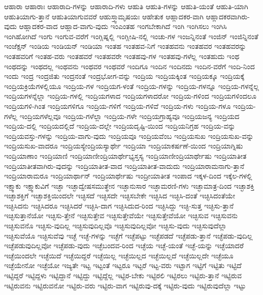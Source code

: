 {ಆಹಾರಾ
ಆಹಾರಾಃ
ಆಹಾರಾದಿ-ಗಳನ್ನು
ಆಹಾರಾದಿ-ಗಳು
ಆಹುತಿ
ಆಹುತಿ-ಗಳನ್ನು
ಆಹುತಿ-ಯಂತೆ
ಆಹುತಿ-ಯಾಗಿ
ಆಹುತಿಯಾಗು-ತ್ತಾನೆ
ಆಹುತಿಯಾಗುವವರೆ
ಆಹುಸ್ತ್ವಾಮೃಷಯಃ
ಆಹೇತುಕ
ಆಹ್ಲಾದಕರ-ವಾಗಿ
ಆಹ್ಲಾದಕರವಾಗಿರು-ವುದು
ಆಹ್ಲಾದಕರ-ವಾದ
ಆಹ್ಲಾದ-ವಾಗು-ವುದು
ಇಂಎಂತಹ
ಇಂಗಬೇಕಾಗಿದೆ
ಇಂಗಿ
ಇಂಗಿಸಲು
ಇಂಗಿಸಿ
ಇಂಗಿಹೋಗಿದೆ
ಇಂಗು
ಇಂಗುವ-ವರೆಗೆ
ಇಂಗ್ಲಿಷ್ನಲ್ಲಿ
ಇಂಗ್ಲೀಷಿ-ನಲ್ಲಿ
ಇಂಚು-ಗಳ
ಇಂಜನ್ನಿನಂತೆ
ಇಂಜಿನ್
ಇಂಜಿನ್ನಿನಂತೆ
ಇಂಜೆಕ್ಷನ್
ಇಂಡಿಯ
ಇಂಡಿಯನ್
ಇಂಡಿಯಾ
ಇಂತಹ
ಇಂತಹವ-ನಿಗೆ
ಇಂತಹವನು
ಇಂತಹವರ
ಇಂತಹವರನ್ನು
ಇಂತಹವರಿಗೆ
ಇಂತಹ-ವರು
ಇಂತಹವರೆ
ಇಂತಹವರೇ
ಇಂತಹವು-ಗಳ
ಇಂತಹವು-ಗಳೆಲ್ಲ
ಇಂತಹುದು
ಇಂಥ
ಇಂಥದನ್ನು
ಇಂಥದಲ್ಲ
ಇಂಥವನು
ಇಂಥವರ
ಇಂಥವರೆ
ಇಂದಿಗೂ
ಇಂದಿನ
ಇಂದಿನದು
ಇಂದಿನ-ವರೆಗೆ
ಇಂದಿ-ನಿಂದ
ಇಂದು
ಇಂದ್ರ
ಇಂದ್ರಜಿತು
ಇಂದ್ರನಂತೆ
ಇಂದ್ರಭೋಗ-ವನ್ನು
ಇಂದ್ರಿಯ
ಇಂದ್ರಿಯಕ್ಕಿಂತ
ಇಂದ್ರಿಯಕ್ಕೂ
ಇಂದ್ರಿಯಕ್ಕೆ
ಇಂದ್ರಿಯಕ್ರಿಯೆಗಳಲ್ಲಿಯೂ
ಇಂದ್ರಿಯ-ಗಳ
ಇಂದ್ರಿಯಗ-ಳಂತೆ
ಇಂದ್ರಿಯ-ಗಳನ್ನು
ಇಂದ್ರಿಯ-ಗಳನ್ನೂ
ಇಂದ್ರಿಯ-ಗಳನ್ನೆಲ್ಲ
ಇಂದ್ರಿಯಗಳನ್ನೆಲ್ಲಾ
ಇಂದ್ರಿಯ-ಗಳಲ್ಲಿ
ಇಂದ್ರಿಯಗಳಾದ
ಇಂದ್ರಿಯಗಳಾದರೋ
ಇಂದ್ರಿಯ-ಗಳಿಂದ
ಇಂದ್ರಿಯಗಳಿಂದಲೂ
ಇಂದ್ರಿಯಗಳಿ-ಗಿಂತ
ಇಂದ್ರಿಯಗಳಿಗೂ
ಇಂದ್ರಿಯ-ಗಳಿಗೆ
ಇಂದ್ರಿಯ-ಗಳಿವೆ
ಇಂದ್ರಿಯ-ಗಳು
ಇಂದ್ರಿಯ-ಗಳೂ
ಇಂದ್ರಿಯ-ಗಳೆಲ್ಲ
ಇಂದ್ರಿಯಗಳೆಲ್ಲವೂ
ಇಂದ್ರಿಯ-ಗಳೆಲ್ಲಾ
ಇಂದ್ರಿಯ-ಗಳೇ
ಇಂದ್ರಿಯಗ್ರಾಹ್ಯವೂ
ಇಂದ್ರಿಯಜನ್ಯ
ಇಂದ್ರಿಯದ
ಇಂದ್ರಿಯ-ದಲ್ಲಿ
ಇಂದ್ರಿಯದಲ್ಲಿದೆ
ಇಂದ್ರಿಯ-ದಲ್ಲೇ
ಇಂದ್ರಿಯದೃಷ್ಟಿ-ಯಿಂದ
ಇಂದ್ರಿಯನಿಗ್ರಹ
ಇಂದ್ರಿಯ-ವನ್ನು
ಇಂದ್ರಿಯವಸ್ತು-ಗಳನ್ನು
ಇಂದ್ರಿಯ-ವಾಗು-ವುದು
ಇಂದ್ರಿಯವೂ
ಇಂದ್ರಿಯವೆಂಬ
ಇಂದ್ರಿಯಸುಖ
ಇಂದ್ರಿಯಸುಖ-ವನ್ನು
ಇಂದ್ರಿಯಸುಖ-ವಾದರೂ
ಇಂದ್ರಿಯಸ್ಯೇಂದ್ರಿಯಸ್ಯಾರ್ಥೇ
ಇಂದ್ರಿಯಾ
ಇಂದ್ರಿಯಾಕರ್ಷಣೆ-ಯಿಂದ
ಇಂದ್ರಿಯಾಗ್ನಿಷು
ಇಂದ್ರಿಯಾಣಾಂ
ಇಂದ್ರಿಯಾಣಿ
ಇಂದ್ರಿಯಾಣೀಂದ್ರಿಯಾರ್ಥೇಭ್ಯಸ್ತಸ್ಯ
ಇಂದ್ರಿಯಾಣೀಂದ್ರಿಯಾರ್ಥೇಷು
ಇಂದ್ರಿಯಾತೀತ
ಇಂದ್ರಿಯಾತೀತವಾಗಿರು-ವುದನ್ನು
ಇಂದ್ರಿಯಾತೀತ-ವಾದ
ಇಂದ್ರಿಯಾತೀತ-ವಾದುದು
ಇಂದ್ರಿಯಾರಾಮನಾಗು-ತ್ತಾನೆ
ಇಂದ್ರಿಯಾರಾಮರೂ
ಇಂದ್ರಿಯಾರ್ಥಾನ್
ಇಂದ್ರಿಯಾರ್ಥೇಷು
ಇಂದ್ರೀಯಾತೀತ
ಇಂಪಾದ
ಇಕ್ಕಳ-ದಿಂದ
ಇಕ್ಕೆಲ-ಗಳಲ್ಲಿ
ಇಕ್ಷ್ವಾಕು
ಇಕ್ಷ್ವಾಕುವಿಗೆ
ಇಚ್ಛಾ
ಇಚ್ಛಾದ್ವೇಷಸಮುತ್ಥೇನ
ಇಚ್ಛಾನುಸಾರ
ಇಚ್ಛಾಮರಣಿ-ಗಳು
ಇಚ್ಛಾಮಾತ್ರ-ದಿಂದ
ಇಚ್ಛಾಶಕ್ತಿ
ಇಚ್ಛಾಶಕ್ತಿಗೆ
ಇಚ್ಛಾಶಕ್ತಿಯಿಂದಲೇ
ಇಚ್ಛಿಸದೆ
ಇಚ್ಛಿಸದೇ
ಇಚ್ಛಿಸಬೇಕೇ
ಇಚ್ಛಿಸಿದ
ಇಚ್ಛಿಸಿ-ದಂತೆ
ಇಚ್ಛಿಸಿದಂತೆಯೇ
ಇಚ್ಛಿಸಿದನು
ಇಚ್ಛಿಸಿದರೂ
ಇಚ್ಛಿಸಿದರೆ
ಇಚ್ಛಿಸಿ-ದಾಗ
ಇಚ್ಛಿಸಿದುದ-ರಿಂದ
ಇಚ್ಛಿಸಿದ್ದು
ಇಚ್ಛಿ-ಸುತ್ತ
ಇಚ್ಛಿಸು-ತ್ತಾನೆ
ಇಚ್ಛಿಸುತ್ತಾನೆಯೋ
ಇಚ್ಛಿಸು-ತ್ತೇನೆ
ಇಚ್ಛಿಸುತ್ತೇವ
ಇಚ್ಛಿಸುತ್ತೇವೆಯೇ
ಇಚ್ಛಿಸುತ್ತೇವೆಯೋ
ಇಚ್ಛಿಸುವ
ಇಚ್ಛಿಸುವನು
ಇಚ್ಛಿಸುವನೊ
ಇಚ್ಛಿಸು-ವುದಿಲ್ಲ
ಇಚ್ಛಿಸುವುದಿಲ್ಲವೊ
ಇಚ್ಛಿಸುವುದಿಲ್ಲವೋ
ಇಚ್ಛಿಸು-ವುದು
ಇಚ್ಛಿಸುವುದೆಲ್ಲಾ
ಇಚ್ಛಿಸುವೆಯೊ
ಇಚ್ಛಿಸುವೆವು
ಇಚ್ಛೆ
ಇಚ್ಛೆ-ಗಳನ್ನು
ಇಚ್ಛೆಗೆ
ಇಚ್ಛೆಪಟ್ಟು
ಇಚ್ಛೆಪಡದೆ
ಇಚ್ಛೆಪಡು-ತ್ತಾನೆ
ಇಚ್ಛೆಪಡು-ವುದಿಲ್ಲ
ಇಚ್ಛೆಪಡುವುದಿಲ್ಲವೋ
ಇಚ್ಛೆಪಡು-ವುದು
ಇಚ್ಛೆಬಂದವ-ರಿಂದ
ಇಚ್ಛೆಯ
ಇಚ್ಛೆ-ಯಂತೆ
ಇಚ್ಛೆ-ಯನ್ನು
ಇಚ್ಛೆಯಾದರೆ
ಇಚ್ಛೆಯಿಂದಲೇ
ಇಚ್ಛೆಯಿದೆ
ಇಚ್ಛೆಯಿದ್ದರೆ
ಇಚ್ಛೆಯಿಲ್ಲ
ಇಚ್ಛೆಯಿಲ್ಲದ
ಇಚ್ಛೆಯಿಲ್ಲದೆ
ಇಚ್ಛೆಯಿಲ್ಲದೇ
ಇಚ್ಛೆಯೂ
ಇಚ್ಛೆಯೇನೋ
ಇಚ್ಛೆಯೋ
ಇಜ್ಯತೇ
ಇಟ್ಟ
ಇಟ್ಟಂತೆ
ಇಟ್ಟರೂ
ಇಟ್ಟರೆ
ಇಟ್ಟ-ವರು
ಇಟ್ಟಾಗ
ಇಟ್ಟಿಗೆ
ಇಟ್ಟಿತು
ಇಟ್ಟಿದೆ
ಇಟ್ಟಿದ್ದರೆ
ಇಟ್ಟಿದ್ದಳು
ಇಟ್ಟಿದ್ದಾನೆ
ಇಟ್ಟಿದ್ದು
ಇಟ್ಟಿದ್ದೆಲ್ಲ
ಇಟ್ಟಿರ-ಬೇಕು
ಇಟ್ಟಿರಲಿ
ಇಟ್ಟಿರಲು
ಇಟ್ಟಿರು-ತ್ತಾನೆ
ಇಟ್ಟಿರುವ
ಇಟ್ಟಿರುವನು
ಇಟ್ಟಿರುವನೋ
ಇಟ್ಟಿರು-ವರು
ಇಟ್ಟಿರು-ವಾಗ
ಇಟ್ಟಿರುವು-ದಕ್ಕೆ
ಇಟ್ಟಿರು-ವುದು
ಇಟ್ಟಿರುವುದೆಲ್ಲಾ
ಇಟ್ಟು
}

